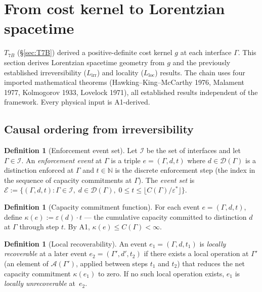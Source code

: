 \documentclass[11pt,a4paper]{article}
\theoremstyle{definition}
\newtheorem{definition}[theorem]{Definition}
\newcommand{\eps}{\varepsilon}
\begin{document}
\newpage

\section{From cost kernel to Lorentzian spacetime}
\label{sec:lorentz}

$T_{7B}$ (\S\ref{sec:T7B}) derived a positive-definite cost kernel $g$
at each interface $\Gamma$.  This section derives Lorentzian spacetime
geometry from $g$ and the previously established irreversibility
($L_{\mathrm{irr}}$) and locality ($L_{\mathrm{loc}}$) results.  The
chain uses four imported mathematical theorems (Hawking--King--McCarthy
1976, Malament 1977, Kolmogorov 1933, Lovelock 1971), all established
results independent of the framework.  Every physical input is
A1-derived.


\subsection{Causal ordering from irreversibility}
\label{sec:causal_order}

\begin{definition}[Enforcement event set]\label{def:event_set}
Let $\mathcal{I}$ be the set of interfaces and let $\Gamma \in
\mathcal{I}$.  An \emph{enforcement event} at $\Gamma$ is a triple
$e = (\Gamma, d, t)$ where $d \in \mathcal{D}(\Gamma)$ is a
distinction enforced at $\Gamma$ and $t \in \mathbb{N}$ is the
discrete enforcement step (the index in the sequence of capacity
commitments at $\Gamma$).  The \emph{event set} is
$\mathcal{E} := \{(\Gamma, d, t) : \Gamma \in \mathcal{I},\;
d \in \mathcal{D}(\Gamma),\; 0 \le t \le
\lfloor C(\Gamma)/\eps^*\rfloor\}$.
\end{definition}

\begin{definition}[Capacity commitment function]\label{def:commit}
For each event $e = (\Gamma, d, t)$, define
$\kappa(e) := \eps(d) \cdot t$ --- the cumulative capacity committed
to distinction $d$ at $\Gamma$ through step $t$.  By A1,
$\kappa(e) \le C(\Gamma) < \infty$.
\end{definition}

\begin{definition}[Local recoverability]\label{def:recoverable}
An event $e_1 = (\Gamma, d, t_1)$ is \emph{locally recoverable} at
a later event $e_2 = (\Gamma', d', t_2)$ if there exists a local
operation at $\Gamma'$ (an element of
$\mathcal{A}(\Gamma')$, applied between steps $t_1$ and $t_2$) that
reduces the net capacity commitment $\kappa(e_1)$ to zero.  If no
such local operation exists, $e_1$ is \emph{locally unrecoverable}
at~$e_2$.
\end{definition}
\end{document}
